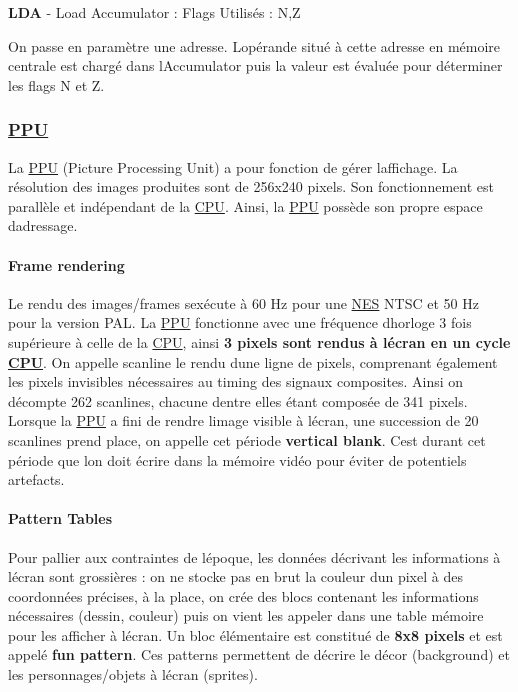 {\bfseries L\+DA} -\/ Load Accumulator \+: Flags Utilisés \+: N,Z

On passe en paramètre une adresse. L\textquotesingle{}opérande situé à cette adresse en mémoire centrale est chargé dans l\textquotesingle{}Accumulator puis la valeur est évaluée pour déterminer les flags N et Z.

\subsubsection*{\hyperlink{struct_p_p_u}{P\+PU}}

La \hyperlink{struct_p_p_u}{P\+PU} (Picture Processing Unit) a pour fonction de gérer l\textquotesingle{}affichage. La résolution des images produites sont de 256x240 pixels. Son fonctionnement est parallèle et indépendant de la \hyperlink{struct_c_p_u}{C\+PU}. Ainsi, la \hyperlink{struct_p_p_u}{P\+PU} possède son propre espace d\textquotesingle{}adressage.

\paragraph*{Frame rendering}

Le rendu des images/frames s\textquotesingle{}exécute à 60 Hz pour une \hyperlink{struct_n_e_s}{N\+ES} N\+T\+SC et 50 Hz pour la version P\+AL. La \hyperlink{struct_p_p_u}{P\+PU} fonctionne avec une fréquence d\textquotesingle{}horloge 3 fois supérieure à celle de la \hyperlink{struct_c_p_u}{C\+PU}, ainsi {\bfseries 3 pixels sont rendus à l\textquotesingle{}écran en un cycle \hyperlink{struct_c_p_u}{C\+PU}}. On appelle scanline le rendu d\textquotesingle{}une ligne de pixels, comprenant également les pixels invisibles nécessaires au timing des signaux composites. Ainsi on décompte 262 scanlines, chacune d\textquotesingle{}entre elles étant composée de 341 pixels. Lorsque la \hyperlink{struct_p_p_u}{P\+PU} a fini de rendre l\textquotesingle{}image visible à l\textquotesingle{}écran, une succession de 20 scanlines prend place, on appelle cet période {\bfseries vertical blank}. C\textquotesingle{}est durant cet période que l\textquotesingle{}on doit écrire dans la mémoire vidéo pour éviter de potentiels artefacts.

\paragraph*{Pattern Tables}

Pour pallier aux contraintes de l\textquotesingle{}époque, les données décrivant les informations à l\textquotesingle{}écran sont grossières \+: on ne stocke pas en brut la couleur d\textquotesingle{}un pixel à des coordonnées précises, à la place, on crée des blocs contenant les informations nécessaires (dessin, couleur) puis on vient les appeler dans une table mémoire pour les afficher à l\textquotesingle{}écran. Un bloc élémentaire est constitué de {\bfseries 8x8 pixels} et est appelé {\bfseries fun pattern}. Ces patterns permettent de décrire le décor (background) et les personnages/objets à l\textquotesingle{}écran (sprites).

